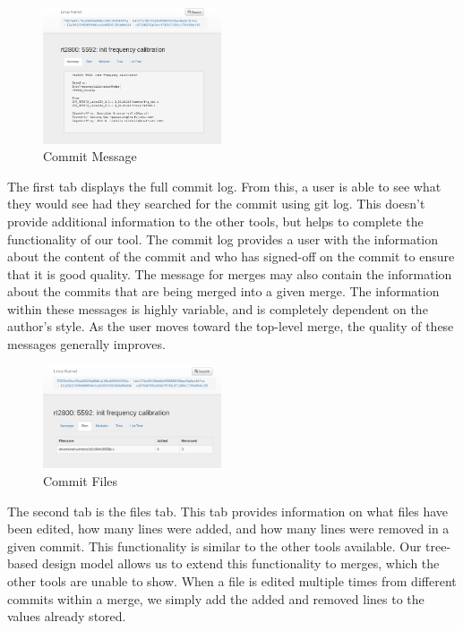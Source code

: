 \documentclass[conference, draftclsnofoot]{IEEEtran}
\begin{document}
\begin{figure}[h]
	\centering
	\includegraphics[width=0.47\textwidth]{figures/message_view.png}
	\caption{Commit Message}
	\label{fig:message}
\end{figure}

The first tab displays the full commit log. From this, a user is able to see
what they would see had they searched for the commit using git log. This
doesn't provide additional information to the other tools, but helps to
complete the functionality of our tool. The commit log provides a user with
the information about the content of the commit and who has signed-off on the
commit to ensure that it is good quality. The message for merges may also
contain the information about the commits that are being merged into a given
merge. The information within these messages is highly variable, and is
completely dependent on the author's style. As the user moves toward the
top-level merge, the quality of these messages generally improves.

\begin{figure}[h]
	\centering
	\includegraphics[width=0.47\textwidth]{figures/file_view.png}
	\caption{Commit Files}
	\label{fig:files}
\end{figure}

The second tab is the files tab. This tab provides information on what files
have been edited, how many lines were added, and how many lines were removed in
a given commit. This functionality is similar to the other tools available. Our
tree-based design model allows us to extend this functionality to merges, which
the other tools are unable to show. When a file is edited multiple times from
different commits within a merge, we simply add the added and removed lines to
the values already stored.\newpage
\end{document}
